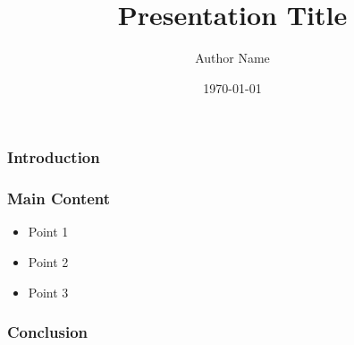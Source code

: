 \documentclass{beamer}
\title{Presentation Title}
\author{Author Name}
\institute{Institution Name}
\date{\today}
\begin{document}
\frame{\titlepage}

\begin{frame}
\frametitle{Introduction}
\lipsum[1]
\end{frame}

\begin{frame}
\frametitle{Main Content}
\begin{itemize}
    \item Point 1
    \item Point 2
    \item Point 3
\end{itemize}
\end{frame}

\begin{frame}
\frametitle{Conclusion}
\lipsum[2]
\end{frame}
\end{document}
